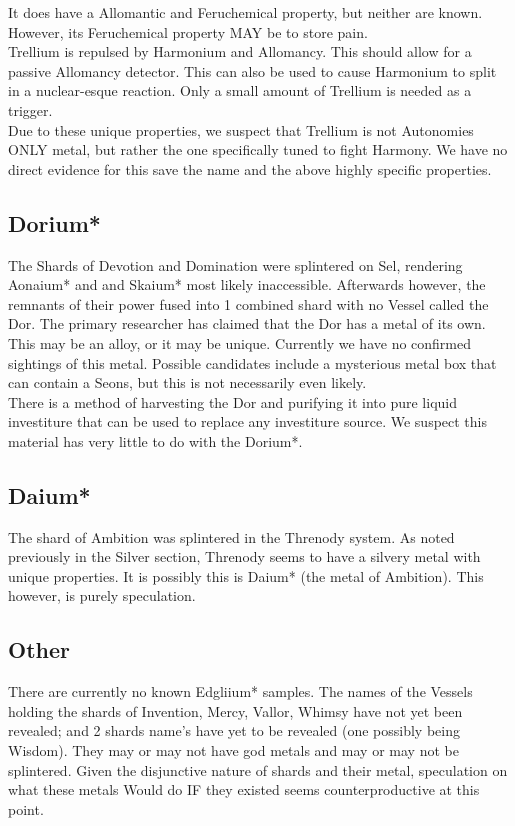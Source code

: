 \documentclass[conference]{IEEEtran}
\newcommand{\n}{\hfill\break}
\begin{document}
It does have a Allomantic and Feruchemical property, but neither are known.  However, its Feruchemical property MAY be to store pain.\cite{TLM-CH34}\\

Trellium is repulsed by Harmonium and Allomancy.\cite{TLM-CH16}  This should allow for a passive Allomancy detector.  This can also be used to cause Harmonium to split in a nuclear-esque reaction.\cite{TLM-CH16}\cite{TLM-CH71}  Only a small amount of Trellium is needed as a trigger.\\

Due to these unique properties, we suspect that Trellium is not Autonomies ONLY metal, but rather the one specifically tuned to fight Harmony.  We have no direct evidence for this save the name and the above highly specific properties.\n 
\subsection*{\textbf{Dorium}*}
The Shards of Devotion and Domination were splintered on Sel,\cite{arcanum-sel}\cite{WoK-ep22} rendering Aonaium* and and Skaium* most likely inaccessible.  Afterwards however, the remnants of their power fused into 1 combined shard with no Vessel called the Dor.\cite{arcanum-sel}  The primary researcher has claimed that the Dor has a metal of its own.\cite{dorium}  This may be an alloy, or it may be unique.  Currently we have no confirmed sightings of this metal.  Possible candidates include a mysterious metal box that can contain a Seons, but this is not necessarily even likely.  \\

There is a method of harvesting the Dor and purifying it into pure liquid investiture that can be used to replace any investiture source.\cite{TLM-CH64}  We suspect this material has very little to do with the Dorium*.\n
\subsection*{\textbf{Daium}*}
The shard of Ambition was splintered in the Threnody system.\cite{arcanum-thren}  As noted previously in the Silver section, Threnody seems to have a silvery metal with unique properties.\cite{SFSFH-CH3}\cite{anchor}\cite{RoW-CH64}   It is possibly this is Daium* (the metal of Ambition).  This however, is purely speculation. 
\n
\subsection*{\textbf{Other}}
There are currently no known Edgliium* samples.
The names of the Vessels holding the shards of Invention, Mercy, Vallor, Whimsy have not yet been revealed; and 2 shards name's have yet to be revealed (one possibly being Wisdom).  They may or may not have god metals and may or may not be splintered.  Given the disjunctive nature of shards and their metal, speculation on what these metals Would do IF they existed seems counterproductive at this point.  
\n
\end{document}
